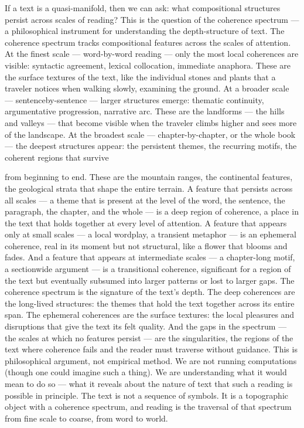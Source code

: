 If a text is a quasi-manifold, then we can ask: what compositional structures persist across scales of reading? This is the question of the coherence spectrum — a philosophical instrument for understanding the depth-structure of text. The coherence spectrum tracks compositional features across the scales of attention. At the finest scale — word-by-word reading — only the most local coherences are visible: syntactic agreement, lexical collocation, immediate anaphora. These are the surface textures of the text, like the individual stones and plants that a traveler notices when walking slowly, examining the ground. At a broader scale — sentenceby-sentence — larger structures emerge: thematic continuity, argumentative progression, narrative arc. These are the landforms — the hills and valleys — that become visible when the traveler climbs higher and sees more of the landscape. At the broadest scale — chapter-by-chapter, or the whole book — the deepest structures appear: the persistent themes, the recurring motifs, the coherent regions that survive

from beginning to end. These are the mountain ranges, the continental features, the geological strata that shape the entire terrain. A feature that persists across all scales — a theme that is present at the level of the word, the sentence, the paragraph, the chapter, and the whole — is a deep region of coherence, a place in the text that holds together at every level of attention. A feature that appears only at small scales — a local wordplay, a transient metaphor — is an ephemeral coherence, real in its moment but not structural, like a flower that blooms and fades. And a feature that appears at intermediate scales — a chapter-long motif, a sectionwide argument — is a transitional coherence, significant for a region of the text but eventually subsumed into larger patterns or lost to larger gaps. The coherence spectrum is the signature of the text’s depth. The deep coherences are the long-lived structures: the themes that hold the text together across its entire span. The ephemeral coherences are the surface textures: the local pleasures and disruptions that give the text its felt quality. And the gaps in the spectrum — the scales at which no features persist — are the singularities, the regions of the text where coherence fails and the reader must traverse without guidance. This is philosophical argument, not empirical method. We are not running computations (though one could imagine such a thing). We are understanding what it would mean to do so — what it reveals about the nature of text that such a reading is possible in principle. The text is not a sequence of symbols. It is a topographic object with a coherence spectrum, and reading is the traversal of that spectrum from fine scale to coarse, from word to world.

